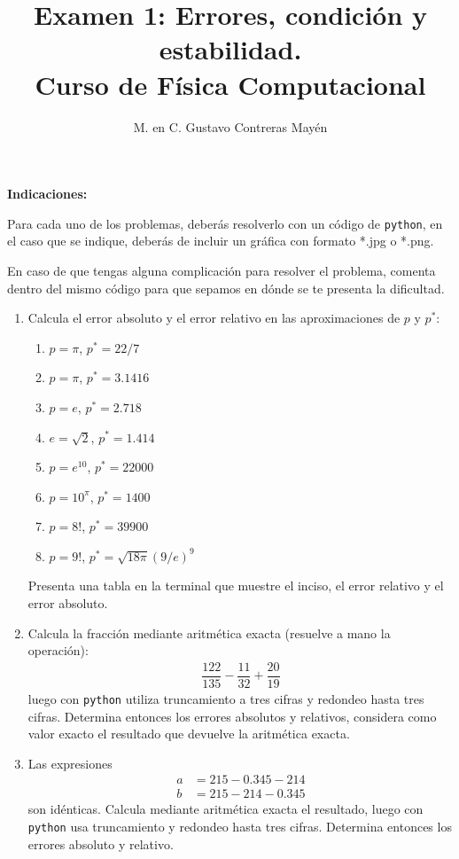 \documentclass[11pt]{article}
\title{Examen 1: Errores, condición y estabilidad. \\ Curso de Física Computacional}
\author{M. en C. Gustavo Contreras Mayén}
\date{ }
\newcommand{\python}{\texttt{python}}
\begin{document}
\maketitle
\fontsize{14}{14}\selectfont
\textbf{Indicaciones: } 

Para cada uno de los problemas, deberás resolverlo con un código de \python, en el caso que se indique, deberás de incluir un gráfica con formato *.jpg o *.png.
\par
En caso de que tengas alguna complicación para resolver el problema, comenta dentro del mismo código para que sepamos en dónde se te presenta la dificultad.
\begin{enumerate}
\item Calcula el error absoluto y el error relativo en las aproximaciones de $p$ y $p^{*}$:
\begin{multicols}{2}
\begin{enumerate}
\item $p = \pi$, $p^{*} = 22/7$
\item $p = \pi$, $p^{*} = 3.1416$
\item $p = e$, $p^{*} = 2.718$
\item $e = \sqrt{2}$, $p^{*} = 1.414$
\item $p= e^{10}$, $p^{*} = 22000$
\item $p= 10^{\pi}$, $p^{*} = 1400$
\item $p = 8!$, $p^{*}=39900$
\item $p = 9!$, $p^{*}= \sqrt{18 \pi} (9/e)^{9}$
\end{enumerate}
\end{multicols}
Presenta una tabla en la terminal que muestre el inciso, el error relativo y el error absoluto.
\item Calcula la fracción mediante aritmética exacta (resuelve a mano la operación):
\begin{align*}
\dfrac{122}{135} - \dfrac{11}{32} + \dfrac{20}{19}
\end{align*}
luego con \python{} utiliza truncamiento a tres cifras y redondeo hasta tres cifras. Determina entonces los errores absolutos y relativos, considera como valor exacto el resultado que devuelve la aritmética exacta.
\item Las expresiones 
\begin{align*}
a &= 215 - 0.345 -214 \\
b &= 215 - 214 - 0.345
\end{align*}
son idénticas. Calcula mediante aritmética exacta el resultado, luego con \python{} usa truncamiento y redondeo hasta tres cifras. Determina entonces los errores absoluto y relativo. 

\end{enumerate}
\end{document}
